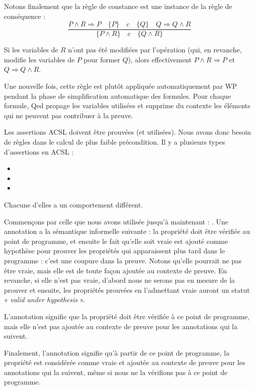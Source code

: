 Notons finalement que la règle de constance est une instance de la règle de
conséquence :
$$\dfrac{P \wedge R \Rightarrow P \quad \{P\}\quad c\quad \{Q\} \quad Q \Rightarrow Q \wedge R}{\{P \wedge R\}\quad c\quad \{Q \wedge R\}}$$



Si les variables de $R$ n'ont pas été modifiées par l'opération (qui, en revanche,
modifie les variables de $P$ pour former $Q$), alors effectivement
$P \wedge R \Rightarrow P$ et $Q \Rightarrow Q \wedge R$.


Une nouvelle fois, cette règle est plutôt appliquée automatiquement par WP
pendant la phase de simplification automatique des formules. Pour chaque formule,
Qed propage les variables utilisées et supprime du contexte les éléments qui
ne peuvent pas contribuer à la preuve.




Les assertions ACSL doivent être prouvées (et utilisées). Nous avons donc besoin
de règles dans le calcul de plus faible précondition. Il y a plusieurs types
d'assertions en ACSL :
\begin{itemize}
  \item {}
  \item {}
  \item {}
\end{itemize}


Chacune d'elles a un comportement différent.


Commençons par celle que nous avons utilisée jusqu'à maintenant :
. Une annotation  a la sémantique
informelle suivante : la propriété  doit être vérifiée au point
de programme, et ensuite le fait qu'elle soit vraie est ajouté comme hypothèse
pour prouver les propriétés qui apparaissent plus tard dans le programme :
c'est une coupure dans la preuve. Notons
qu'elle pourrait ne pas être vraie, mais elle est de toute façon ajoutée
au contexte de preuve. En revanche, si elle n'est pas vraie, d'abord nous ne
serons pas en mesure de la prouver et ensuite, les propriétés prouvées en
l'admettant vraie auront un statut « \textit{valid under hypothesis} ».


L'annotation  signifie que la propriété  doit
être vérifiée à ce point de programme, mais elle n'est pas ajoutée au contexte
de preuve pour les annotations qui la suivent.


Finalement, l'annotation  signifie qu'à partir de ce point
de programme, la propriété  est considérée comme vraie et ajoutée
au contexte de preuve pour les annotations qui la suivent, même si nous ne la
vérifions pas à ce point de programme.


